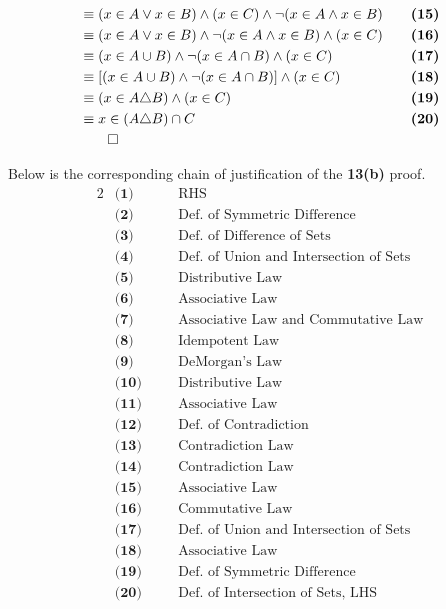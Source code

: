 \begin{alignat*}{2}
&\equiv (x \in A \vee x \in B) \wedge (x \in C) \wedge \neg (x \in A \wedge x \in B) && \quad \textbf{(15)}\\
&\equiv (x \in A \vee x \in B) \wedge \neg (x \in A \wedge x \in B) \wedge (x \in C)  && \quad \textbf{(16)}\\
&\equiv (x \in A \cup B) \wedge \neg (x \in A \cap B) \wedge (x \in C)  && \quad \textbf{(17)}\\
&\equiv [(x \in A \cup B) \wedge \neg (x \in A \cap B)] \wedge (x \in C)  && \quad \textbf{(18)}\\
&\equiv (x \in A \triangle B) \wedge (x \in C)  && \quad \textbf{(19)}\\
&\equiv x \in (A \triangle B) \cap C  && \quad \textbf{(20)}\\
&\qed \\
\end{alignat*}

\pagebreak

Below is the corresponding chain of justification of the \textbf{13(b)} proof.
\begin{alignat*}{2}
&\textbf{(1)} && \quad \text{RHS}\\
&\textbf{(2)} && \quad \text{Def. of Symmetric Difference}\\
&\textbf{(3)} && \quad \text{Def. of Difference of Sets}\\
&\textbf{(4)} && \quad \text{Def. of Union and Intersection of Sets}\\
&\textbf{(5)} && \quad \text{Distributive Law}\\
&\textbf{(6)} && \quad \text{Associative Law}\\
&\textbf{(7)} && \quad \text{Associative Law and Commutative Law}\\
&\textbf{(8)} && \quad \text{Idempotent Law}\\
&\textbf{(9)} && \quad \text{DeMorgan's Law}\\
&\textbf{(10)} && \quad \text{Distributive Law}\\
&\textbf{(11)} && \quad \text{Associative Law}\\
&\textbf{(12)} && \quad \text{Def. of Contradiction}\\
&\textbf{(13)} && \quad \text{Contradiction Law}\\
&\textbf{(14)} && \quad \text{Contradiction Law}\\
&\textbf{(15)} && \quad \text{Associative Law}\\
&\textbf{(16)} && \quad \text{Commutative Law}\\
&\textbf{(17)} && \quad \text{Def. of Union and Intersection of Sets}\\
&\textbf{(18)} && \quad \text{Associative Law}\\
&\textbf{(19)} && \quad \text{Def. of Symmetric Difference}\\
&\textbf{(20)} && \quad \text{Def. of Intersection of Sets, LHS}\\
\end{alignat*}
\pagebreak

